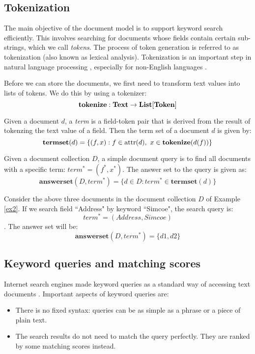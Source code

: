 \subsection{Tokenization}

The main objective of the document model is to support keyword search efficiently.  This involves searching for documents whose fields contain certain sub-strings, which we call {\em tokens}.  The process of token generation is referred to as tokenization (also known as lexical analysis).  Tokenization is an important step in natural language processing \cite{jimenez2018impact,kudo2018sentencepiece}, especially for non-English languages \cite{takaoka2018sudachi,cao2011research}.

Before we can store the documents, we first need to transform text values into lists of tokens.  We do this by using a tokenizer:
$$
\mathbf{tokenize} : \mathbf{Text} \to \mathbf{List}[\mathbf{Token}]
$$

Given a document $d$, a {\em term} is a field-token pair that is derived from the result of tokenzing the text value of a field.
Then the term set of a document $d$ is given by:
$$
\mathbf{termset}(d) = \{
  (f, x): f\in\operatorname{attr}(d),\ x\in\mathbf{tokenize}(d(f))
\}
$$

Given a document collection $D$, a simple document query is to find all documents with a specific term: $term^* = (f^*, x^*)$.  The answer set to the query is given as:
$$\mathbf{answerset}(D, term^*) = \{d\in D: term^*\in\mathbf{termset}(d)\}$$

\begin{example}
Consider the above three documents in the document collection $D$ of Example \ref{ex2}. If we search field ``Address" by keyword ``Simcoe", the search query is:
$$term^* = (Address, Simcoe)$$. 
The answer set will be:
$$\mathbf{answerset}(D, term^*) = \{d1, d2\}$$

\end{example}

\subsection{Keyword queries and matching scores}

Internet search engines made keyword queries as a standard way of accessing text documents \cite{ntoulas2004s}.
Important aspects of keyword queries are:
\begin{itemize}
    \item There is no fixed syntax: queries can be as simple as a phrase or a piece of plain text.
    \item The search results do not need to match the query perfectly. They are ranked by some matching scores instead.
\end{itemize}

